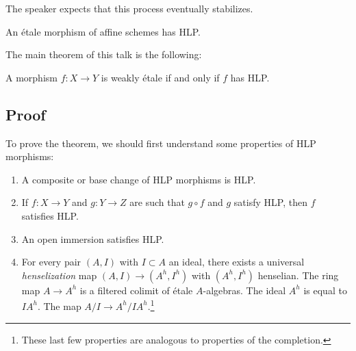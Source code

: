 \documentclass{article}
\begin{document}
\begin{rmk}
	The speaker expects that this process eventually stabilizes.
\end{rmk}

\begin{ex}
	An \'etale morphism of affine schemes has HLP.
\end{ex}

The main theorem of this talk is the following:

\begin{thm}
	A morphism $f: X \to Y$ is weakly \'etale if and only if $f$ has HLP.
\end{thm}

\subsection{Proof}

To prove the theorem, we should first understand some properties of HLP morphisms:
\begin{enumerate}
	\item A composite or base change of HLP morphisms is HLP.
	\item If $f: X \to Y$ and $g: Y \to Z$ are such that $g \circ f$ and $g$ satisfy HLP, then $f$ satisfies HLP.
	\item An open immersion satisfies HLP.
	\item For every pair $(A, I)$ with $I \subset A$ an ideal, there exists a universal \emph{henselization} map $(A, I) \to (A^h, I^h)$ with $(A^h, I^h)$ henselian.
		The ring map $A \to A^h$ is a filtered colimit of \'etale $A$-algebras.
		The ideal $A^h$ is equal to $I A^h$.
		The map $A / I \to A^h / I A^h$.\footnote{These last few properties are analogous to properties of the completion.}
\end{enumerate}
\end{document}
